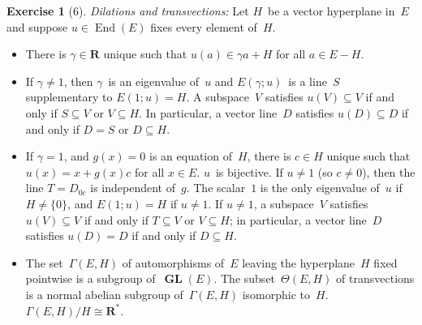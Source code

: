 \documentclass[letterpaper,12pt]{article}
\newcommand{\R}{\mathbf{R}}
\newcommand{\Rnz}{\R^*}
\newcommand{\iso}{\cong}
\DeclareMathOperator{\End}{End}
\DeclareMathOperator{\GL}{\mathbf{GL}}
\theoremstyle{definition}
\newtheorem*{exer}{Exercise}
\theoremstyle{remark}
\begin{document}
\begin{exer}[6]
\emph{Dilations and transvections:} Let \(H\)~be a vector hyperplane in~\(E\) and suppose \(u\in\End(E)\) fixes every element of~\(H\).
\begin{itemize}[itemsep=0pt]
\item There is \(\gamma\in\R\) unique such that \(u(a)\in\gamma a+H\) for all \(a\in E-H\).
\item If \(\gamma\ne 1\), then \(\gamma\)~is an eigenvalue of~\(u\) and \(E(\gamma;u)\)~is a line~\(S\) supplementary to \(E(1;u)=H\). A subspace~\(V\) satisfies \(u(V)\subseteq V\) if and only if \(S\subseteq V\) or \(V\subseteq H\). In particular, a vector line~\(D\) satisfies \(u(D)\subseteq D\) if and only if \(D=S\) or \(D\subseteq H\).
\item If \(\gamma=1\), and \(g(x)=0\) is an equation of~\(H\), there is \(c\in H\) unique such that \(u(x)=x+g(x)c\) for all \(x\in E\). \(u\)~is bijective. If \(u\ne 1\) (so \(c\ne 0\)), then the line \(T=D_{0c}\) is independent of~\(g\). The scalar~\(1\) is the only eigenvalue of~\(u\) if \(H\ne\{0\}\), and \(E(1;u)=H\) if \(u\ne 1\). If \(u\ne 1\), a subspace~\(V\) satisfies \(u(V)\subseteq V\) if and only if \(T\subseteq V\) or \(V\subseteq H\); in particular, a vector line~\(D\) satisfies \(u(D)=D\) if and only if \(D\subseteq H\).
\item The set~\(\Gamma(E,H)\) of automorphisms of~\(E\) leaving the hyperplane~\(H\) fixed pointwise is a subgroup of~\(\GL(E)\). The subset~\(\Theta(E,H)\) of transvections is a normal abelian subgroup of~\(\Gamma(E,H)\) isomorphic to~\(H\). \(\Gamma(E,H)/H\iso\Rnz\).
\end{itemize}
\end{exer}
\end{document}
